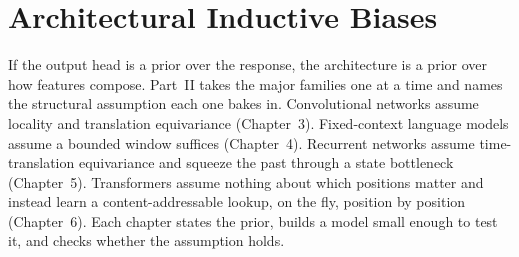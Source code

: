\part{Architectural Inductive Biases}

If the output head is a prior over the response, the architecture is a
prior over how features compose. Part~II takes the major families one at
a time and names the structural assumption each one bakes in.
Convolutional networks assume locality and translation equivariance
(Chapter~3). Fixed-context language models assume a bounded window
suffices (Chapter~4). Recurrent networks assume time-translation
equivariance and squeeze the past through a state bottleneck (Chapter~5).
Transformers assume nothing about which positions matter and instead
learn a content-addressable lookup, on the fly, position by position
(Chapter~6). Each chapter states the prior, builds a model small enough
to test it, and checks whether the assumption holds.





